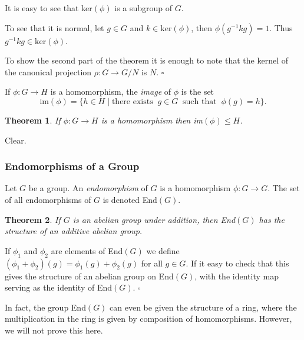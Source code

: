 \documentclass[10pt]{article}
\newtheorem{theorem}{Theorem}[section]
\newenvironment{proof}[1][Proof]{\begin{trivlist}
\item[\hskip \labelsep {\itshape #1}]}{\end{trivlist}}
\newenvironment{definition}[1][Definition]{\begin{trivlist}
\item[\hskip \labelsep {\bfseries #1}]}{\end{trivlist}}
\begin{document}
\begin{proof}
It is easy to see that ker$(\phi)$ is a subgroup of $G$.

To see that it is normal, let $g \in G$ and $k \in \mbox{ker}(\phi)$, then $\phi(g^{-1}kg) = 1$. Thus $g^{-1}kg \in \mbox{ker}(\phi)$.

To show the second part of the theorem it is enough to note that the kernel of the canonical projection $\rho : G \to G/N$ is $N$. $\square$
\end{proof}

\begin{definition}
If $\phi : G \to H$ is a homomorphism, the \emph{image} of $\phi$ is the set
$$\mbox{im}(\phi) = \{h \in H \;|\; \mbox{there exists}\;\; g \in G \;\;\mbox{such that}\;\; \phi(g) = h\}.$$
\end{definition}

\begin{theorem}
If $\phi : G \to H$ is a homomorphism then im$(\phi) \leq H$.
\end{theorem}

\begin{proof}
Clear.
\end{proof}

\subsubsection{Endomorphisms of a Group}

\begin{definition}
Let $G$ be a group. An \emph{endomorphism} of $G$ is a homomorphism $\phi : G \to G$. The set of all endomorphisms of $G$ is denoted End$(G)$.
\end{definition}

\begin{theorem}
If $G$ is an abelian group under addition, then End$(G)$ has the structure of an additive abelian group.
\end{theorem}

\begin{proof}
If $\phi_1$ and $\phi_2$ are elements of End$(G)$ we define $(\phi_1 + \phi_2)(g) = \phi_1(g) + \phi_2(g)$ for all $g \in G$. If it easy to check that this gives the structure of an abelian group on End$(G)$, with the identity map serving as the identity of End$(G)$. $\square$
\end{proof}

In fact, the group End$(G)$ can even be given the structure of a ring, where the multiplication in the ring is given by composition of homomorphisms. However, we will not prove this here.
\end{document}
